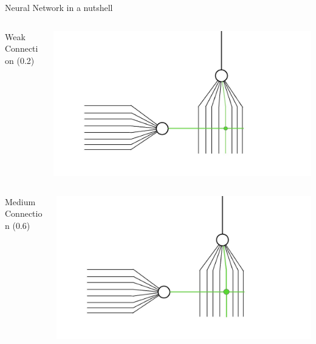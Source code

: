 \documentclass[10pt]{beamer}
\begin{document}
	\begin{frame}[c]{Neural Network in a nutshell}
		\begin{columns}
			\begin{column}{0.5\textwidth}
				\begin{center}
					\large{Weak Connection (0.2)}
				\end{center}
			\end{column}
			\begin{column}{0.5\textwidth}
				\begin{center}
					\includegraphics[width=0.85\linewidth]{images/sonn_wc}
				\end{center}
			\end{column}		
		\end{columns}
		\begin{columns}
			\begin{column}{0.5\textwidth}
				\begin{center}
					\large{Medium Connection (0.6)}
				\end{center}
			\end{column}
			\begin{column}{0.5\textwidth}
				\begin{center}
					\includegraphics[width=0.85\linewidth]{images/sonn_mc}
				\end{center}

\end{column}
\end{columns}
\end{frame}
\end{document}
